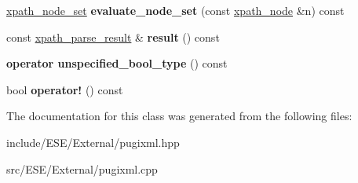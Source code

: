 \begin{DoxyCompactItemize}
\item 
\hypertarget{classpugi_1_1xpath__query_ad5e3826c813e90c30db42f1778bc8adc}{\hyperlink{classpugi_1_1xpath__node__set}{xpath\-\_\-node\-\_\-set} {\bfseries evaluate\-\_\-node\-\_\-set} (const \hyperlink{classpugi_1_1xpath__node}{xpath\-\_\-node} \&n) const }\label{classpugi_1_1xpath__query_ad5e3826c813e90c30db42f1778bc8adc}

\item 
\hypertarget{classpugi_1_1xpath__query_a36d9bd4c41c46ee085e7cb4af8ced7d3}{const \hyperlink{structpugi_1_1xpath__parse__result}{xpath\-\_\-parse\-\_\-result} \& {\bfseries result} () const }\label{classpugi_1_1xpath__query_a36d9bd4c41c46ee085e7cb4af8ced7d3}

\item 
\hypertarget{classpugi_1_1xpath__query_a3e3410d6f652ada1ac9e059ebe87184c}{{\bfseries operator unspecified\-\_\-bool\-\_\-type} () const }\label{classpugi_1_1xpath__query_a3e3410d6f652ada1ac9e059ebe87184c}

\item 
\hypertarget{classpugi_1_1xpath__query_aaf62ebc3aa5dbce405ee1dbdd55e779a}{bool {\bfseries operator!} () const }\label{classpugi_1_1xpath__query_aaf62ebc3aa5dbce405ee1dbdd55e779a}

\end{DoxyCompactItemize}


The documentation for this class was generated from the following files\-:\begin{DoxyCompactItemize}
\item 
include/\-E\-S\-E/\-External/pugixml.\-hpp\item 
src/\-E\-S\-E/\-External/pugixml.\-cpp\end{DoxyCompactItemize}
